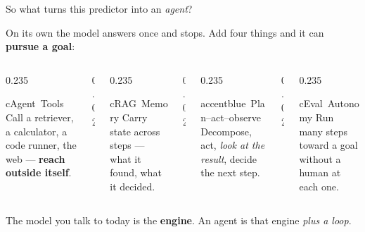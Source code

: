 \begin{frame}{So what turns this predictor into an \emph{agent}?}
  \begin{center}\small
  On its own the model answers once and stops. Add four things and it can
  \textbf{pursue a goal}:
  \end{center}
  \vspace{4pt}
  \begin{columns}[t, totalwidth=\textwidth]
    \begin{column}{0.235\textwidth}
      \begin{featbox}{cAgent}{\faTools\ Tools}
        \scriptsize Call a retriever, a calculator, a code runner, the web ---
        \textbf{reach outside itself}.
      \end{featbox}
    \end{column}
    \begin{column}{0.02\textwidth}\end{column}
    \begin{column}{0.235\textwidth}
      \begin{featbox}{cRAG}{\faBrain\ Memory}
        \scriptsize Carry state across steps --- what it found, what it decided.
      \end{featbox}
    \end{column}
    \begin{column}{0.02\textwidth}\end{column}
    \begin{column}{0.235\textwidth}
      \begin{featbox}{accentblue}{\faSync\ Plan--act--observe}
        \scriptsize Decompose, act, \emph{look at the result}, decide the next step.
      \end{featbox}
    \end{column}
    \begin{column}{0.02\textwidth}\end{column}
    \begin{column}{0.235\textwidth}
      \begin{featbox}{cEval}{\faCompass\ Autonomy}
        \scriptsize Run many steps toward a goal without a human at each one.
      \end{featbox}
    \end{column}
  \end{columns}
  \vspace{10pt}
  \begin{center}\small\color{labnavy}%
    The model you talk to today is the \textbf{engine}. An agent is that engine \emph{plus a loop}.\end{center}
\end{frame}

